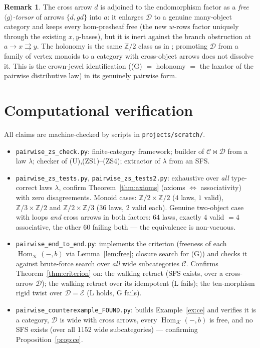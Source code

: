 \documentclass[11pt]{article}
\theoremstyle{definition}
\newtheorem{remark}[theorem]{Remark}
\newcommand{\Hom}{\operatorname{Hom}}
\newcommand{\C}{\mathcal{C}}
\newcommand{\D}{\mathcal{D}}
\newcommand{\K}{\mathcal{K}}
\newcommand{\E}{\mathcal{E}}
\begin{document}
\begin{remark}
The cross arrow $d$ is adjoined to the endomorphism factor as a \emph{free
$\langle g\rangle$-torsor} of arrows $\{d,gd\}$ into $a$: it enlarges $\D$ to a
genuine many-object category and keeps every hom-presheaf free (the new $w$-rows
factor uniquely through the existing $x,y$-bases), but it is inert against the
branch obstruction at $a\to x\rightrightarrows y$. The holonomy is the same
$\mathbb{Z}/2$ class as in \cite{single}; promoting $\D$ from a family of vertex
monoids to a category with cross-object arrows does not dissolve it. This is the
crown-jewel identification ((G) $=$ holonomy $=$ the laxator of the pairwise
distributive law) in its genuinely pairwise form.
\end{remark}

\section{Computational verification}\label{sec:comp}

All claims are machine-checked by scripts in \texttt{projects/scratch/}.
\begin{itemize}
\item \texttt{pairwise\_zs\_check.py}: finite-category framework; builder of
$\C\bowtie\D$ from a law $\lambda$; checker of (U),(ZS1)--(ZS4); extractor of
$\lambda$ from an SFS.
\item \texttt{pairwise\_zs\_tests.py}, \texttt{pairwise\_zs\_tests2.py}:
exhaustive over \emph{all} type-correct laws $\lambda$, confirm
Theorem~\ref{thm:axioms} (axioms $\iff$ associativity) with zero disagreements.
Monoid cases: $\mathbb{Z}/2\times\mathbb{Z}/2$ ($4$ laws, $1$ valid),
$\mathbb{Z}/3\times\mathbb{Z}/2$ and $\mathbb{Z}/2\times\mathbb{Z}/3$ ($36$ laws,
$2$ valid each). Genuine two-object case with loops \emph{and} cross arrows in
both factors: $64$ laws, exactly $4$ valid $=4$ associative, the other $60$
failing both --- the equivalence is non-vacuous.
\item \texttt{pairwise\_end\_to\_end.py}: implements the criterion (freeness of
each $\Hom_\K(-,b)$ via Lemma~\ref{lem:free}; closure search for (G)) and checks
it against brute-force search over \emph{all} wide subcategories $\C$. Confirms
Theorem~\ref{thm:criterion} on: the walking retract (SFS exists, over a
cross-arrow $\D$); the walking retract over its idempotent (L fails); the
ten-morphism rigid twist over $\D=\E$ (L holds, G fails).
\item \texttt{pairwise\_counterexample\_FOUND.py}: builds Example~\ref{ex:ce} and
verifies it is a category, $\D$ is wide with cross arrows, every $\Hom_\K(-,b)$ is
free, and no SFS exists (over all $1152$ wide subcategories) --- confirming
Proposition~\ref{prop:ce}.
\end{itemize}
\end{document}
